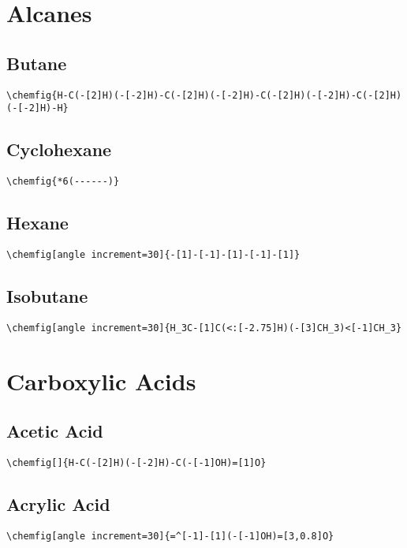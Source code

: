 \chapter{Alcanes}\label{app:alcanes}
\section{Butane}\label{app:butane}
\begin{lstlisting}
\chemfig{H-C(-[2]H)(-[-2]H)-C(-[2]H)(-[-2]H)-C(-[2]H)(-[-2]H)-C(-[2]H)(-[-2]H)-H}
\end{lstlisting}

\section{Cyclohexane}\label{app:cyclohexane}
\begin{lstlisting}
\chemfig{*6(------)}
\end{lstlisting}

\section{Hexane}\label{app:hexane}
\begin{lstlisting}
\chemfig[angle increment=30]{-[1]-[-1]-[1]-[-1]-[1]}
\end{lstlisting}

\section{Isobutane}\label{app:isobutane}
\begin{lstlisting}
\chemfig[angle increment=30]{H_3C-[1]C(<:[-2.75]H)(-[3]CH_3)<[-1]CH_3}
\end{lstlisting}



\chapter{Carboxylic Acids}\label{app:carboxylic-acids}


\section{Acetic Acid}\label{app:acetic-acid}
\begin{lstlisting}
\chemfig[]{H-C(-[2]H)(-[-2]H)-C(-[-1]OH)=[1]O}
\end{lstlisting}


\section{Acrylic Acid}\label{app:acrylic-acid}
\begin{lstlisting}
\chemfig[angle increment=30]{=^[-1]-[1](-[-1]OH)=[3,0.8]O}
\end{lstlisting}


